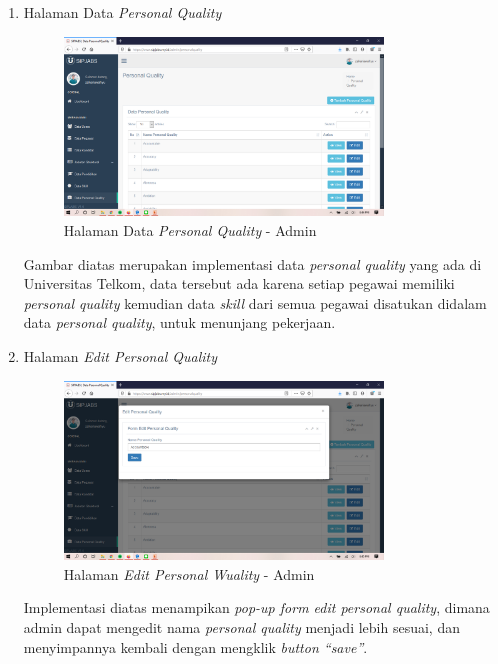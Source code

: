 \begin{enumerate}
	\newpage
	\item Halaman Data \textit{Personal Quality}
	\begin{figure}
		\centering
		\includegraphics[width=0.8\textwidth]
		{pics/admin/implementasi/datapersonalquality.png}
		\caption{Halaman Data \textit{Personal Quality} - Admin}
		\label{fig:CC10}
	\end{figure}
	Gambar diatas merupakan implementasi data \textit{personal quality} yang ada di Universitas Telkom, data tersebut ada karena setiap pegawai memiliki \textit{personal quality} kemudian data \textit{skill} dari semua pegawai disatukan didalam data \textit{personal quality},  untuk menunjang pekerjaan. 
	
	\item Halaman \textit{Edit Personal Quality}
	\begin{figure}
		\centering
		\includegraphics[width=0.8\textwidth]
		{pics/admin/implementasi/editpersonalquality.png}
		\caption{Halaman \textit{Edit Personal Wuality} - Admin}
		\label{fig:CC10}
	\end{figure}
	Implementasi diatas menampikan \textit{pop-up form edit personal quality}, dimana admin dapat mengedit nama \textit{personal quality} menjadi lebih sesuai, dan menyimpannya kembali dengan mengklik \textit{button “save”}.
	

\end{enumerate}
